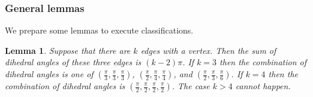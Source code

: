 \documentclass[suppldata, dvipdfmx]{interact}
\theoremstyle{plain}%
\newtheorem{theorem}{Theorem}[section]
\newtheorem{lemma}[theorem]{Lemma}
\theoremstyle{definition}
\theoremstyle{remark}
\theoremstyle{problemstyle}
\begin{document}





\subsubsection{General lemmas}
We prepare some lemmas to execute classifications.

\begin{lemma}\label{lemma:sum}
Suppose that there are $k$ edges with a vertex. Then the sum of
 dihedral angles of these three edges is $(k-2)\pi$.  If $k=3$ then the combination of dihedral angles is 
one of $\left( \frac{\pi}{3}, \frac{\pi}{3}, \frac{\pi}{3}\right)$, $\left( \frac{\pi}{2}, \frac{\pi}{4}, \frac{\pi}{4}\right)$, and $\left( \frac{\pi}{2}, \frac{\pi}{3}, \frac{\pi}{6}\right)$.
If $k=4$ then the combination of dihedral angles is 
$\left( \frac{\pi}{2}, \frac{\pi}{2}, \frac{\pi}{2}, \frac{\pi}{2}\right)$. The case $k>4$ cannot happen.
\end{lemma}
\end{document}
